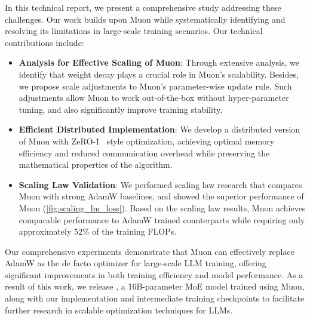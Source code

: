 In this technical report, we present a comprehensive study addressing these challenges. Our work builds upon Muon while systematically identifying and resolving its limitations in large-scale training scenarios. Our technical contributions include:

\begin{itemize}
    \item \textbf{Analysis for Effective Scaling of Muon}: Through extensive analysis, we identify that weight decay plays a crucial role in Muon's scalability. Besides, we propose scale adjustments to Muon's parameter-wise update rule. Such adjustments allow Muon to work out-of-the-box without hyper-parameter tuning, and also significantly improve training stability.
    
    \item \textbf{Efficient Distributed Implementation}: We develop a distributed version of Muon with ZeRO-1~\citep{Rajbhandari_2020} style optimization, achieving optimal memory efficiency and reduced communication overhead while preserving the mathematical properties of the algorithm.
    
    \item \textbf{Scaling Law Validation}: We performed scaling law research that compares Muon with strong AdamW baselines, and showed the superior performance of Muon (\ref{fig:scaling_lm_loss}). Based on the scaling law results, Muon achieves comparable performance to AdamW trained counterparts while requiring only approximately 52\% of the training FLOPs.
    
    
\end{itemize}


Our comprehensive experiments demonstrate that Muon can effectively replace AdamW as the de facto optimizer for large-scale LLM training, offering significant improvements in both training efficiency and model performance. As a result of this work, we release \ours, a 16B-parameter MoE model trained using Muon, along with our implementation and intermediate training checkpoints to facilitate further research in scalable optimization techniques for LLMs. 